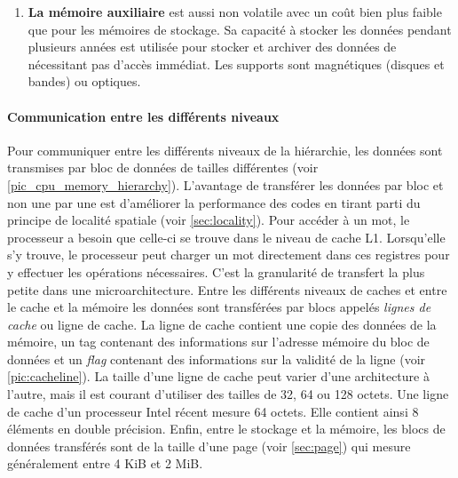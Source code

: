 \begin{enumerate}
            \item \textbf{La mémoire auxiliaire} est aussi non volatile avec un coût bien plus faible que pour les mémoires de stockage. Sa capacité à stocker les données pendant plusieurs années est utilisée pour stocker et archiver des données de nécessitant pas d'accès immédiat. Les supports sont magnétiques (disques et bandes) ou optiques.
        
        \end{enumerate}
        
        \paragraph{Communication entre les différents niveaux}
            
            Pour communiquer entre les différents niveaux de la hiérarchie, les données sont transmises par bloc de données de tailles différentes (voir \autoref{pic_cpu_memory_hierarchy}). L'avantage de transférer les données par bloc et non une par une est d'améliorer la performance des codes en tirant parti du principe de localité spatiale (voir \autoref{sec:locality}).
            Pour accéder à un mot, le processeur a besoin que celle-ci se trouve dans le niveau de cache L1. Lorsqu'elle s’y trouve, le processeur peut charger un mot directement dans ces registres pour y effectuer les opérations nécessaires. C'est la granularité de transfert la plus petite dans une microarchitecture. Entre les différents niveaux de caches et entre le cache et la mémoire les données sont transférées par blocs appelés \textit{lignes de cache} ou ligne de cache. La ligne de cache contient une copie des données de la mémoire, un tag contenant des informations sur l'adresse mémoire du bloc de données et un \textit{flag} contenant des informations sur la validité de la ligne (voir \autoref{pic:cacheline}). La taille d'une ligne de cache peut varier d'une architecture à l'autre, mais il est courant d'utiliser des tailles de 32, 64 ou 128 octets. Une ligne de cache d'un processeur Intel récent mesure 64 octets. Elle contient ainsi 8 éléments en double précision. Enfin, entre le stockage et la mémoire, les blocs de données transférés sont de la taille d'une page (voir \autoref{sec:page}) qui mesure généralement entre 4 KiB et 2 MiB.
            
            
            
